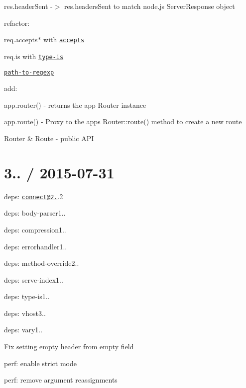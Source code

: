 {\begin{DoxyItemize}
\begin{DoxyItemize}
\item {\ttfamily res.\+header\+Sent} -\/$>$ {\ttfamily res.\+headers\+Sent} to match node.\+js Server\+Response object
\end{DoxyItemize}
\item refactor\+:
\begin{DoxyItemize}
\item {\ttfamily req.\+accepts$\ast$} with \href{https://github.com/expressjs/accepts}{\tt accepts}
\item {\ttfamily req.\+is} with \href{https://github.com/expressjs/type-is}{\tt type-\/is}
\item \href{https://github.com/component/path-to-regexp}{\tt path-\/to-\/regexp}
\end{DoxyItemize}
\item add\+:
\begin{DoxyItemize}
\item {\ttfamily app.\+router()} -\/ returns the app Router instance
\item {\ttfamily app.\+route()} -\/ Proxy to the app\textquotesingle{}s {\ttfamily Router\+::route()} method to create a new route
\item Router \& Route -\/ public A\+PI
\end{DoxyItemize}
\end{DoxyItemize}}

{\ttfamily \section*{3.. / 2015-\/07-\/31 }}

{\ttfamily }

{\ttfamily 
\begin{DoxyItemize}
\item deps\+: \href{mailto:connect@2.30}{\tt connect@2.}.2
\begin{DoxyItemize}
\item deps\+: body-\/parser1..
\item deps\+: compression1..
\item deps\+: errorhandler1..
\item deps\+: method-\/override2..
\item deps\+: serve-\/index1..
\item deps\+: type-\/is1..
\item deps\+: vhost3..
\end{DoxyItemize}
\item deps\+: vary1..
\begin{DoxyItemize}
\item Fix setting empty header from empty {\ttfamily field}
\item perf\+: enable strict mode
\item perf\+: remove argument reassignments
\end{DoxyItemize}
\end{DoxyItemize}}

